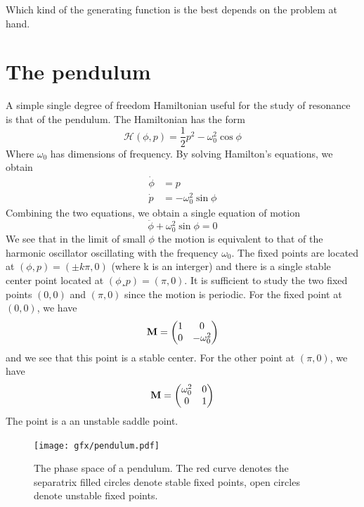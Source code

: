 \documentclass[ twoside,openright,titlepage,numbers=noenddot,headinclude,%
                footinclude=true,cleardoublepage=empty,abstractoff, %
                BCOR=5mm,paper=a4,fontsize=11pt,%
                american,%
                ]{scrreprt}
\begin{document}
Which kind of the generating function is the best depends on the
problem at hand.

\section{The pendulum}
\label{sec:pendulum}
A simple single degree of freedom Hamiltonian useful for the study
of resonance is that of the pendulum. The Hamiltonian has the form
\begin{equation}
    \mathcal{H}(\phi,p)= \frac{1}{2} p^2 -\omega_0^2\cos\phi
\end{equation}
Where $\omega_0$ has dimensions of frequency. By solving 
Hamilton's equations, we obtain
\begin{align}
    \dot{\phi} &= p\\
    \dot{p} &= - \omega_0^2\sin\phi
\end{align}
Combining the two equations, we obtain a single equation of motion
\begin{equation}
    \ddot{\phi}+\omega_0^2\sin\phi =0
\end{equation}
We see that in the limit of small $\phi$ the motion is equivalent to
that of the harmonic oscillator oscillating with the frequency
$\omega_0$. The fixed points are located at
$(\phi, p)=(\pm k\pi,0)$ (where k is an interger) and there is 
a single 
stable center point located at $(\phi¸ p)=(\pi, 0)$. It is 
sufficient to study the two fixed points $(0,0)$ and $(\pi,0)$
since the motion is periodic. For the fixed point at $(0,0)$, we have
\begin{equation}
    \boldsymbol{\mathbf{M}}=
    \begin{pmatrix}
        1 & 0\\
        0 & -\omega_0^2 
    \end{pmatrix}
\end{equation}
and we see that this point is a stable center. For the other point 
at $(\pi,0)$, we have
\begin{equation}
    \boldsymbol{\mathbf{M}}=
    \begin{pmatrix}
        \omega_0^2 & 0\\
        0 & 1
    \end{pmatrix}
\end{equation}
The point is a an unstable saddle point.
\begin{figure}[htb]
\centering
\texttt{[image: gfx/pendulum.pdf]}
\caption{The phase space of a pendulum. The red curve denotes the 
    separatrix filled circles denote stable fixed points, open circles denote
    unstable fixed points.}
\label{fig:pendulum}
\end{figure}
\end{document}
